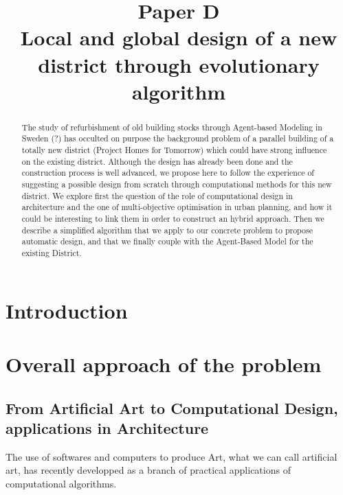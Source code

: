 \documentclass[english]{article}
\begin{document}
\title{Paper D\\
Local and global design of a new district through evolutionary algorithm}

\maketitle
\vspace{2cm}

\begin{abstract}
The study of refurbishment of old building stocks through Agent-based
Modeling in Sweden (?) has occulted on purpose the background problem of a parallel
building of a totally new district (Project Homes for Tomorrow)
which could have strong influence on the existing district. Although the
design has already been done and the construction process is well
advanced, we propose here to follow the experience of suggesting
a possible design from scratch through computational methods for this
new district. We explore first the question of the role of computational
design in architecture and the one of multi-objective optimisation
in urban planning, and how it could be interesting to link them in
order to construct an hybrid approach. Then we describe a simplified
algorithm that we apply to our concrete problem to propose automatic
design, and that we finally couple with the Agent-Based Model for
the existing District.

\newpage{}
\end{abstract}

\section*{Introduction}


\section{Overall approach of the problem}


\subsection{From Artificial Art to Computational Design, applications in Architecture}

The use of softwares and computers to produce Art, what we can call
artificial art, has recently developped as a branch of practical applications
of computational algorithms.

\bigskip{}
\end{document}
